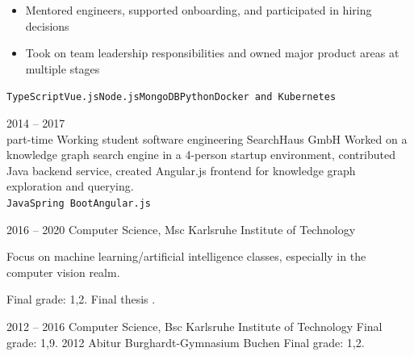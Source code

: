 \documentclass[8pt]{developercv} %
\newcommand{\linebreaksmall}{\vspace{2mm}}
\begin{document}
\begin{entrylist}
{\begin{itemize}[nosep, topsep=0pt, left=5pt, after=\vspace{6pt}]
			\item Mentored engineers, supported onboarding, and participated in hiring decisions
			\item Took on team leadership responsibilities and owned major product areas at multiple stages
		\end{itemize}
		 \texttt{TypeScript}\slashsep\texttt{Vue.js}\slashsep\texttt{Node.js}\slashsep\texttt{MongoDB}\slashsep\texttt{Python}\slashsep\texttt{Docker and Kubernetes}} \linebreaksmall
	\entry
		{2014 -- 2017\\\footnotesize{part-time}}
		{Working student software engineering}
		{SearchHaus GmbH}
		{Worked on a knowledge graph search engine in a 4-person startup environment, contributed Java backend service, created Angular.js frontend for knowledge graph exploration and querying.
		\linebreaksmall \\ \texttt{Java}\slashsep\texttt{Spring Boot}\slashsep\texttt{Angular.js}}
\end{entrylist}



\begin{entrylist}
	\entry
		{2016 -- 2020}
		{Computer Science, Msc}
		{Karlsruhe Institute of Technology}
		{Focus on machine learning/artificial intelligence classes, especially in the computer vision realm.
		
		Final grade: 1,2. Final thesis .}
	\entry
		{2012 -- 2016}
		{Computer Science, Bsc}
		{Karlsruhe Institute of Technology}
		{Final grade: 1,9.}
	\entry
		{2012}
		{Abitur}
		{Burghardt-Gymnasium Buchen}
		{Final grade: 1,2.}
\end{entrylist}

\end{document}
